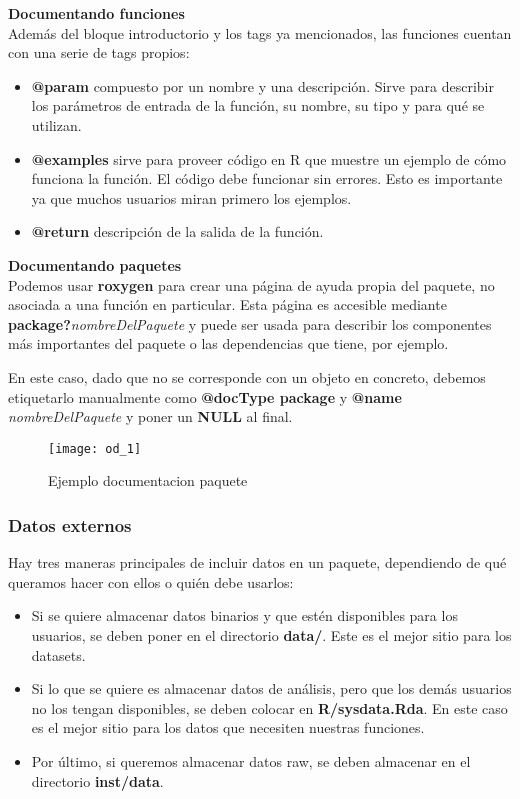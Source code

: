 \textbf{Documentando funciones} \\
Adem\'as del bloque introductorio y los tags ya mencionados, las funciones cuentan con una
serie de tags propios:
\begin{itemize}
    \item \textbf{@param} compuesto por un nombre y una descripci\'on. Sirve para describir los
par\'ametros de entrada de la funci\'on, su nombre, su tipo y para qu\'e se utilizan.
    \item \textbf{@examples} sirve para proveer c\'odigo en R que muestre un ejemplo de c\'omo funciona
la funci\'on. El c\'odigo debe funcionar sin errores. Esto es importante ya que muchos
usuarios miran primero los ejemplos.
    \item \textbf{@return} descripci\'on de la salida de la funci\'on.
\end{itemize}

\textbf{Documentando paquetes}\\
Podemos usar \textbf{roxygen} para crear una p\'agina de ayuda propia del paquete, no asociada a
una funci\'on en particular. Esta p\'agina es accesible mediante\\ \textbf{package?}\textit{nombreDelPaquete} y
puede ser usada para describir los componentes m\'as importantes del paquete o las
dependencias que tiene, por ejemplo.

En este caso, dado que no se corresponde con un objeto en concreto, debemos etiquetarlo
manualmente como \textbf{@docType package} y \textbf{@name} \textit{nombreDelPaquete} y poner un \textbf{NULL} al final.

\begin{figure}[H]
    \centering
    \texttt{[image: od\_1]}
    \caption{Ejemplo documentacion paquete }
    \label{fig:paquete}
\end{figure} 

\subsubsection{Datos externos}

Hay tres maneras principales de incluir datos en un paquete, dependiendo de qu\'e queramos
hacer con ellos o qui\'en debe usarlos:

\begin{itemize}
    \item Si se quiere almacenar datos binarios y que est\'en disponibles para los usuarios, se
deben poner en el directorio \textbf{data/}. Este es el mejor sitio para los datasets.
    \item Si lo que se quiere es almacenar datos de an\'alisis, pero que los dem\'as usuarios no
los tengan disponibles, se deben colocar en \textbf{R/sysdata.Rda}. En este caso es el mejor
sitio para los datos que necesiten nuestras funciones.
    \item Por \'ultimo, si queremos almacenar datos raw, se deben almacenar en el directorio
\textbf{inst/data}.
\end{itemize}


